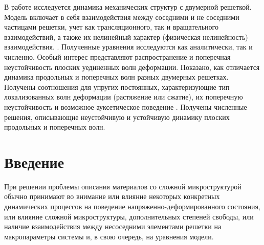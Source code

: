 
В работе исследуется динамика механических структур с двумерной решеткой. Модель включает в себя взаимодействия между соседними и не соседними частицами решетки, учет как трансляционного, так и вращательного взаимодействий, а также их нелинейный характер (физическая нелинейность) взаимодействия. . Полученные уравнения исследуются как аналитически, так и численно. Особый интерес представляют распространение и поперечная неустойчивость плоских уединенных волн деформации. Показано, как отличается динамика продольных и поперечных волн разных двумерных решетках. Получены соотношения для упругих постоянных, характеризующие тип локализованных волн деформации (растяжение или сжатие), их поперечную неустойчивость и возможное ауксетическое поведение . Получены численные решения, описывающие неустойчивую и устойчивую динамику плоских продольных и поперечных волн.
	
\section{Введение}


При решении проблемы описания материалов со сложной микроструктурой обычно принимают во внимание или влияние некоторых конкретных динамических процессов на поведение напряженно-деформированного состояния, или влияние сложной микроструктуры, дополнительных степеней свободы, или наличие взаимодействия между несоседними элементами решетки на макропараметры системы и, в свою очередь, на уравнения модели.
	
